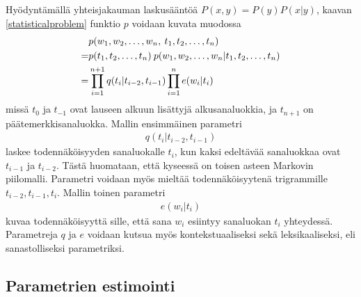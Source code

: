 \documentclass[utf8,bachelor,manualbib]{gradu3}
\begin{document}
Hyödyntämällä yhteisjakauman laskusääntöä $P(x,y) = P(y)P(x|y)$, kaavan \ref{statisticalproblem} funktio $p$ voidaan kuvata muodossa
\begin{align}
\hphantom{=} & p(w_1, w_2, \ldots, w_n,\: t_1, t_2, \ldots, t_n) \\
= & p(t_1, t_2, \ldots, t_n)\:p(w_1, w_2, \ldots, w_n|t_1, t_2, \ldots, t_n) \\
= & \prod_{i=1}^{n+1} q(t_i | t_{i-2}, t_{i-1}) \prod_{i=1}^{n}e(w_i | t_i)
\end{align}
missä $t_0$ ja $t_{-1}$ ovat lauseen alkuun lisättyjä alkusanaluokkia, ja $t_{n+1}$ on päätemerkkisanaluokka. Mallin ensimmäinen parametri
\begin{align}
q(t_i | t_{i-2}, t_{i-1})
\end{align}
laskee todennäköisyyden sanaluokalle $t_i$, kun kaksi edeltävää sanaluokkaa ovat $t_{i-1}$ ja $t_{i-2}$. Tästä huomataan, että kyseessä on toisen asteen Markovin piilomalli. Parametri voidaan myös mieltää todennäköisyytenä trigrammille $t_{i-2}, t_{i-1}, t_i $. Mallin toinen parametri
\begin{align}
e(w_i | t_i)
\label{lexicalparameter}
\end{align}
kuvaa todennäköisyyttä sille, että sana $w_i$ esiintyy sanaluokan $t_i$ yhteydessä. Parametreja $q$ ja $e$ voidaan kutsua myös kontekstuaaliseksi sekä leksikaaliseksi, eli sanastolliseksi parametriksi. \citep{brants2000}

\subsection{Parametrien estimointi}
\end{document}
